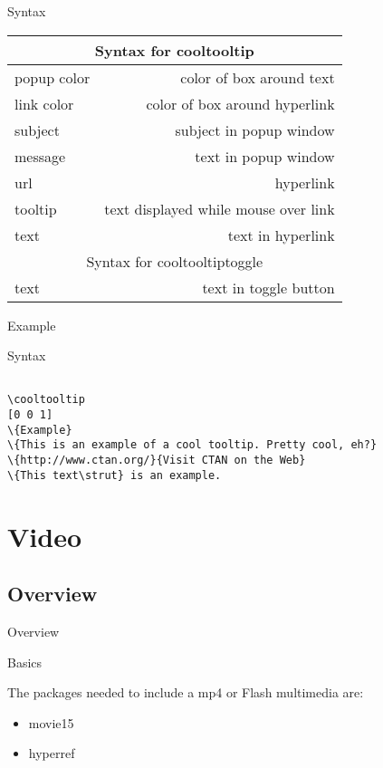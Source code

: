 \documentclass[article]{beamer}
\begin{document}
\begin{frame}[fragile]{Syntax}
\centering
\begin{tabular}{|l|r|}
\hline
\multicolumn{2}{|c|}{Syntax for cooltooltip}\\
\hline
popup color & color of box around text\\
\hline
link color & color of box around hyperlink\\
\hline
subject & subject in popup window\\
\hline
message & text in popup window\\
\hline
url & hyperlink\\
\hline
tooltip & text displayed while mouse over link\\
\hline
text & text in hyperlink\\
\hline
\multicolumn{2}{|c|}{Syntax for cooltooltiptoggle}\\
\hline
text & text in toggle button\\
\hline
\end{tabular}

\end{frame}


\begin{frame}[fragile]{Example}

\begin{block}{Syntax}

\begin{verbatim}

\cooltooltip
[0 0 1]
\{Example}
\{This is an example of a cool tooltip. Pretty cool, eh?}
\{http://www.ctan.org/}{Visit CTAN on the Web}
\{This text\strut} is an example.

\end{verbatim}

\end{block}

\end{frame}


\section{Video}
\subsection{Overview}

\begin{frame}[fragile]{Overview}

\begin{block}{Basics}

The packages needed to include a mp4 or Flash multimedia are:

\begin{itemize}
\item movie15
\item hyperref
\end{itemize}

\end{block}

\end{frame}
\end{document}
